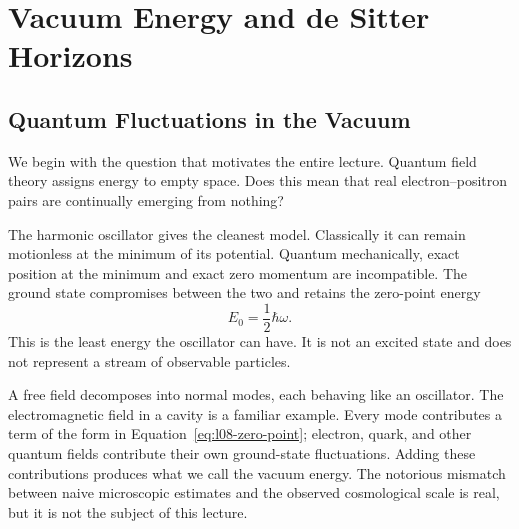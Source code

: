 \chapter{Vacuum Energy and de Sitter Horizons}


\section{Quantum Fluctuations in the Vacuum}

We begin with the question that motivates the entire lecture. Quantum field theory assigns energy to empty space. Does this mean that real electron--positron pairs are continually emerging from nothing?

\begin{classroomqa}
\end{classroomqa}

The harmonic oscillator gives the cleanest model. Classically it can remain motionless at the minimum of its potential. Quantum mechanically, exact position at the minimum and exact zero momentum are incompatible. The ground state compromises between the two and retains the zero-point energy
\begin{equation}
E_0=\frac{1}{2}\hbar\omega.
\label{eq:l08-zero-point}
\end{equation}
This is the least energy the oscillator can have. It is not an excited state and does not represent a stream of observable particles.

A free field decomposes into normal modes, each behaving like an oscillator. The electromagnetic field in a cavity is a familiar example. Every mode contributes a term of the form in Equation~\eqref{eq:l08-zero-point}; electron, quark, and other quantum fields contribute their own ground-state fluctuations. Adding these contributions produces what we call the vacuum energy. The notorious mismatch between naive microscopic estimates and the observed cosmological scale is real, but it is not the subject of this lecture.

